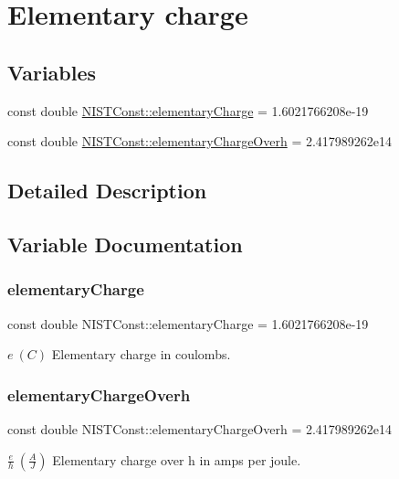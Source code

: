 \hypertarget{group___elementary_charge}{}\section{Elementary charge}
\label{group___elementary_charge}
\subsection*{Variables}
\begin{DoxyCompactItemize}
\item 
const double \hyperlink{group___elementary_charge_gaaa025a77a5281c83628ff8cb46f8038f}{N\+I\+S\+T\+Const\+::elementary\+Charge} = 1.\+6021766208e-\/19
\item 
const double \hyperlink{group___elementary_charge_ga262dea92054df909a97626e3c804f1b4}{N\+I\+S\+T\+Const\+::elementary\+Charge\+Overh} = 2.\+417989262e14
\end{DoxyCompactItemize}


\subsection{Detailed Description}


\subsection{Variable Documentation}
\mbox{\label{group___elementary_charge_gaaa025a77a5281c83628ff8cb46f8038f}} 
\subsubsection{\texorpdfstring{elementary\+Charge}{elementaryCharge}}
{\footnotesize\ttfamily const double N\+I\+S\+T\+Const\+::elementary\+Charge = 1.\+6021766208e-\/19}

$e \ (C)$ Elementary charge in coulombs. \mbox{\label{group___elementary_charge_ga262dea92054df909a97626e3c804f1b4}} 
\subsubsection{\texorpdfstring{elementary\+Charge\+Overh}{elementaryChargeOverh}}
{\footnotesize\ttfamily const double N\+I\+S\+T\+Const\+::elementary\+Charge\+Overh = 2.\+417989262e14}

$\frac{e}{h} \ (\frac{A}{J})$ Elementary charge over h in amps per joule. 